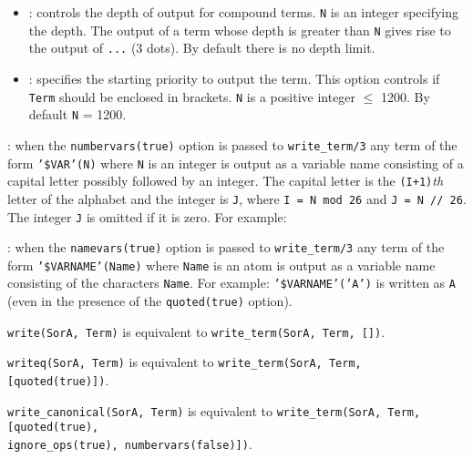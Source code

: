 \begin{itemize}
\item {}: controls the depth of output for
compound terms. \texttt{N} is an integer specifying the depth. The output of
a term whose depth is greater than \texttt{N} gives rise to the output of
\texttt{...} (3 dots). By default there is no depth limit.

\item {}: specifies the starting priority 
to output the term. This option controls if \texttt{Term} should be enclosed
in brackets. \texttt{N} is a positive integer $\leq$ 1200. By default
\texttt{N} = 1200.

\end{itemize}

: when the \texttt{numbervars(true)} option is
passed to \texttt{write\_term/3} any term of the form \texttt{'\$VAR'(N)}
where \texttt{N} is an integer is output as a variable name consisting of a
capital letter possibly followed by an integer. The capital letter is the
\texttt{(I+1)}\emph{th} letter of the alphabet and the integer is
\texttt{J}, where \texttt{I = N mod 26} and \texttt{J = N // 26}. The
integer \texttt{J} is omitted if it is zero. For example: 

\begin{CodeTwoCols}[2cm]
\end{CodeTwoCols}

: when the \texttt{namevars(true)} option is passed
to \texttt{write\_term/3} any term of the form \texttt{'\$VARNAME'(Name)}
where \texttt{Name} is an atom is output as a variable name consisting of
the characters \texttt{Name}. For example: \texttt{'\$VARNAME'('A')} is
written as \texttt{A} (even in the presence of the \texttt{quoted(true)}
option).

\texttt{write(SorA, Term)} is equivalent to
\texttt{write\_term(SorA, Term, [])}.

\texttt{writeq(SorA, Term)} is equivalent to
\texttt{write\_term(SorA, Term, [quoted(true)])}.

\texttt{write\_canonical(SorA, Term)} is equivalent to
\texttt{write\_term(SorA, Term, [quoted(true), \\
ignore\_ops(true), numbervars(false)])}.


